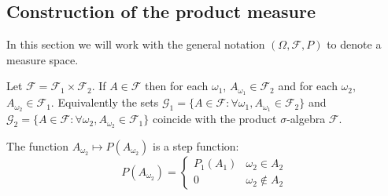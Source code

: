 \subsection{Construction of the product measure}

    In this section we will work with the general notation $(\Omega, \mathcal{F}, P)$ to denote a measure space.


    \begin{property}
        Let $\mathcal{F} = \mathcal{F}_1\times\mathcal{F}_2$. If $A\in\mathcal{F}$ then for each $\omega_1$, $A_{\omega_1}\in\mathcal{F}_2$ and for each $\omega_2$, $A_{\omega_2}\in\mathcal{F}_1$. Equivalently the sets $\mathcal{G}_1 = \{A\in\mathcal{F}:\forall \omega_1,A_{\omega_1}\in\mathcal{F}_2\}$ and $\mathcal{G}_2 = \{A\in\mathcal{F}:\forall \omega_2, A_{\omega_2}\in\mathcal{F}_1\}$ coincide with the product $\sigma$-algebra $\mathcal{F}$.
    \end{property}

    \begin{property}
        The function $A_{\omega_2}\mapsto P(A_{\omega_2})$ is a step function:
        \[
            P(A_{\omega_2}) =
            \begin{cases}
                P_1(A_1)&\omega_2\in A_2\\
                0&\omega_2\not\in A_2
            \end{cases}
        \]
    \end{property}

